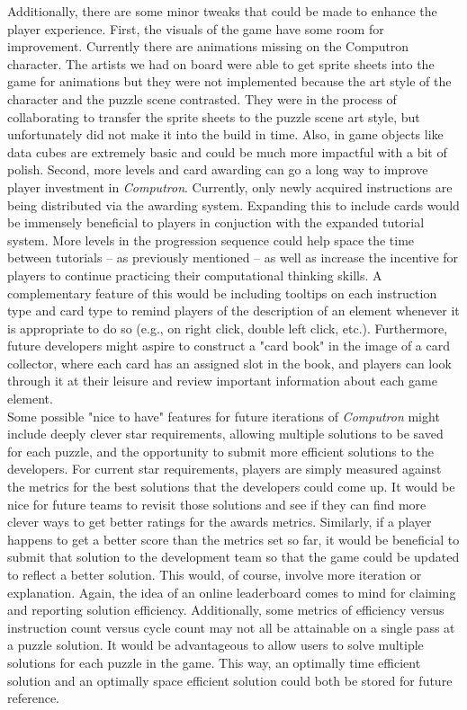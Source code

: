 Additionally, there are some minor tweaks that could be made to enhance the player experience. First, the visuals of the game have some room for improvement. Currently there are animations missing on the Computron character. The artists we had on board were able to get sprite sheets into the game for animations but they were not implemented because the art style of the character and the puzzle scene contrasted. They were in the process of collaborating to transfer the sprite sheets to the puzzle scene art style, but unfortunately did not make it into the build in time. Also, in game objects like data cubes are extremely basic and could be much more impactful with a bit of polish. Second, more levels and card awarding can go a long way to improve player investment in \textit{Computron}. Currently, only newly acquired instructions are being distributed via the awarding system. Expanding this to include cards would be immensely beneficial to players in conjuction with the expanded tutorial system. More levels in the progression sequence could help space the time between tutorials -- as previously mentioned -- as well as increase the incentive for players to continue practicing their computational thinking skills. A complementary feature of this would be including tooltips on each instruction type and card type to remind players of the description of an element whenever it is appropriate to do so (e.g., on right click, double left click, etc.). Furthermore, future developers might aspire to construct a "card book" in the image of a card collector, where each card has an assigned slot in the book, and players can look through it at their leisure and review important information about each game element.\\

Some possible "nice to have" features for future iterations of \textit{Computron} might include deeply clever star requirements, allowing multiple solutions to be saved for each puzzle, and the opportunity to submit more efficient solutions to the developers. For current star requirements, players are simply measured against the metrics for the best solutions that the developers could come up. It would be nice for future teams to revisit those solutions and see if they can find more clever ways to get better ratings for the awards metrics. Similarly, if a player happens to get a better score than the metrics set so far, it would be beneficial to submit that solution to the development team so that the game could be updated to reflect a better solution. This would, of course, involve more iteration or explanation. Again, the idea of an online leaderboard comes to mind for claiming and reporting solution efficiency. Additionally, some metrics of efficiency versus instruction count versus cycle count may not all be attainable on a single pass at a puzzle solution. It would be advantageous to allow users to solve multiple solutions for each puzzle in the game. This way, an optimally time efficient solution and an optimally space efficient solution could both be stored for future reference.\\


